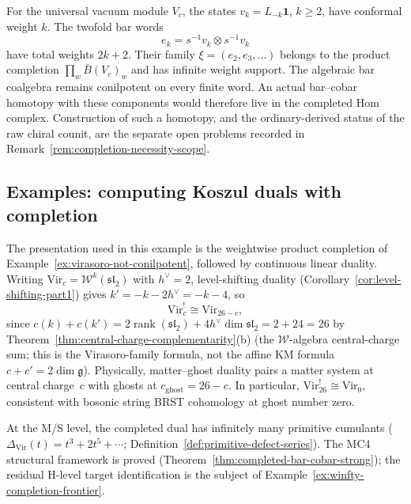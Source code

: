\begin{example}
\label{ex:virasoro-not-conilpotent}
For the universal vacuum module \(V_c\), the states
\(v_k=L_{-k}\mathbf1\), \(k\geq2\), have conformal weight \(k\).
The twofold bar words
\[
 e_k=s^{-1}v_k\otimes s^{-1}v_k
\]
have total weights \(2k+2\).  Their family
\(\xi=(e_2,e_3,\ldots)\) belongs to the product completion
\(\prod_w\bar B(V_c)_w\) and has infinite weight support.  The
algebraic bar coalgebra remains conilpotent on every finite word.
An actual bar--cobar homotopy with these components would therefore
live in the completed Hom complex.  Construction of such a homotopy,
and the ordinary-derived status of the raw chiral counit, are the
separate open problems recorded in
Remark~\ref{rem:completion-necessity-scope}.
\end{example}

\subsection{Examples: computing Koszul duals with completion}
\label{sec:koszul-duals-completion-examples}

\begin{example}
\label{ex:virasoro-koszul-dual}

The presentation used in this example is the weightwise product
completion of Example~\ref{ex:virasoro-not-conilpotent}, followed by
continuous linear duality.
Writing $\mathrm{Vir}_c = \mathcal{W}^k(\mathfrak{sl}_2)$
with $h^\vee = 2$, level-shifting duality
(Corollary~\ref{cor:level-shifting-part1}) gives
$k' = -k - 2h^\vee = -k-4$, so
\begin{equation}
\mathrm{Vir}_c^! \cong \mathrm{Vir}_{26-c},
\end{equation}
since $c(k) + c(k') = 2\operatorname{rank}(\mathfrak{sl}_2) + 4h^\vee\dim\mathfrak{sl}_2 = 2 + 24 = 26$ by Theorem~\ref{thm:central-charge-complementarity}(b) (the $\mathcal{W}$-algebra central-charge sum; this is the Virasoro-family formula, not the affine KM formula $c + c' = 2\dim\mathfrak{g}$). Physically, matter--ghost duality pairs a matter system at central charge~$c$ with ghosts at $c_{\mathrm{ghost}} = 26 - c$. In particular, $\mathrm{Vir}_{26}^! \cong \mathrm{Vir}_0$, consistent with bosonic string BRST cohomology at ghost number zero.

At the M/S level, the completed dual has infinitely many primitive cumulants ($\Delta_{\mathrm{Vir}}(t) = t^3 + 2t^5 + \cdots$; Definition~\ref{def:primitive-defect-series}). The MC4 structural framework is proved (Theorem~\ref{thm:completed-bar-cobar-strong}); the residual H-level target identification is the subject of Example~\ref{ex:winfty-completion-frontier}.
\end{example}

